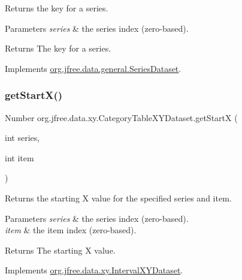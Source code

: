 Returns the key for a series.


\begin{DoxyParams}{Parameters}
{\em series} & the series index (zero-\/based).\\
\hline
\end{DoxyParams}
\begin{DoxyReturn}{Returns}
The key for a series. 
\end{DoxyReturn}


Implements \mbox{\hyperlink{interfaceorg_1_1jfree_1_1data_1_1general_1_1_series_dataset_a60488892b2314a05a012999e26a74178}{org.\+jfree.\+data.\+general.\+Series\+Dataset}}.

\mbox{\label{classorg_1_1jfree_1_1data_1_1xy_1_1_category_table_x_y_dataset_ad3ea675c3e162845c8055b7411003e0a}} 
\subsubsection{\texorpdfstring{get\+Start\+X()}{getStartX()}}
{\footnotesize\ttfamily Number org.\+jfree.\+data.\+xy.\+Category\+Table\+X\+Y\+Dataset.\+get\+StartX (\begin{DoxyParamCaption}\item[{int}]{series,  }\item[{int}]{item }\end{DoxyParamCaption})}

Returns the starting X value for the specified series and item.


\begin{DoxyParams}{Parameters}
{\em series} & the series index (zero-\/based). \\
\hline
{\em item} & the item index (zero-\/based).\\
\hline
\end{DoxyParams}
\begin{DoxyReturn}{Returns}
The starting X value. 
\end{DoxyReturn}


Implements \mbox{\hyperlink{interfaceorg_1_1jfree_1_1data_1_1xy_1_1_interval_x_y_dataset_a7548ec7d60d72463313dc6f10aceee62}{org.\+jfree.\+data.\+xy.\+Interval\+X\+Y\+Dataset}}.

